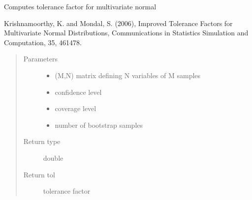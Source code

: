 \documentclass[letterpaper,10pt,english]{sphinxmanual}
\begin{document}
\begin{fulllineitems}
\label{\detokenize{tolerance:tolerance.mvtol_region}}
Computes tolerance factor for multivariate normal

Krishnamoorthy, K. and Mondal, S. (2006), Improved Tolerance Factors for Multivariate Normal
Distributions, Communications in Statistics \sphinxhyphen{} Simulation and Computation, 35, 461\textendash{}478.
\begin{quote}\begin{description}
\item[{Parameters}] \leavevmode\begin{itemize}
\item {} 
 \textendash{} (M,N) matrix defining N variables of M samples

\item {} 
 \textendash{} confidence level

\item {} 
 \textendash{} coverage level

\item {} 
 \textendash{} number of bootstrap samples

\end{itemize}

\item[{Return type}] \leavevmode
double

\item[{Return tol}] \leavevmode
tolerance factor

\end{description}\end{quote}

\end{fulllineitems}

\end{document}
